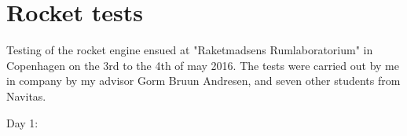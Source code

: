 \chapter{Rocket tests}

Testing of the rocket engine ensued at "Raketmadsens Rumlaboratorium" in Copenhagen on the 3rd to the 4th of may 2016. The tests were carried out by me in company by my advisor Gorm Bruun Andresen, and seven other students from Navitas.

Day 1:
